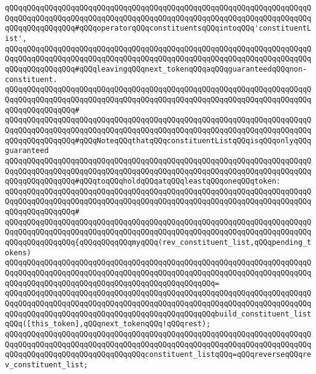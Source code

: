 \verb|qQQqqQQqqQQqqQQqqQQqqQQqqQQqqQQqqQQqqQQqqQQqqQQqqQQqqQQqqQQqqQQqqQQqqQQqqQQqqQQqqQQqqQQqqQQqqQQqqQQqqQQqqQQqqQQqqQQqqQQqqQQqqQQqqQQqqQQqqQQqqQQqqQQqqQQqqQQq#qQQqoperatorqQQqconstituentsqQQqintoqQQq'constituentList',|\newline
\verb|qQQqqQQqqQQqqQQqqQQqqQQqqQQqqQQqqQQqqQQqqQQqqQQqqQQqqQQqqQQqqQQqqQQqqQQqqQQqqQQqqQQqqQQqqQQqqQQqqQQqqQQqqQQqqQQqqQQqqQQqqQQqqQQqqQQqqQQqqQQqqQQqqQQqqQQqqQQq#qQQqleavingqQQqnext_tokenqQQqaqQQqguaranteedqQQqnon-constituent.|\newline
\verb|qQQqqQQqqQQqqQQqqQQqqQQqqQQqqQQqqQQqqQQqqQQqqQQqqQQqqQQqqQQqqQQqqQQqqQQqqQQqqQQqqQQqqQQqqQQqqQQqqQQqqQQqqQQqqQQqqQQqqQQqqQQqqQQqqQQqqQQqqQQqqQQqqQQqqQQqqQQq#|\newline
\verb|qQQqqQQqqQQqqQQqqQQqqQQqqQQqqQQqqQQqqQQqqQQqqQQqqQQqqQQqqQQqqQQqqQQqqQQqqQQqqQQqqQQqqQQqqQQqqQQqqQQqqQQqqQQqqQQqqQQqqQQqqQQqqQQqqQQqqQQqqQQqqQQqqQQqqQQqqQQq#qQQqNoteqQQqthatqQQqconstituentListqQQqisqQQqonlyqQQqguaranteed|\newline
\verb|qQQqqQQqqQQqqQQqqQQqqQQqqQQqqQQqqQQqqQQqqQQqqQQqqQQqqQQqqQQqqQQqqQQqqQQqqQQqqQQqqQQqqQQqqQQqqQQqqQQqqQQqqQQqqQQqqQQqqQQqqQQqqQQqqQQqqQQqqQQqqQQqqQQqqQQqqQQq#qQQqtoqQQqholdqQQqatqQQqleastqQQqoneqQQqtoken:|\newline
\verb|qQQqqQQqqQQqqQQqqQQqqQQqqQQqqQQqqQQqqQQqqQQqqQQqqQQqqQQqqQQqqQQqqQQqqQQqqQQqqQQqqQQqqQQqqQQqqQQqqQQqqQQqqQQqqQQqqQQqqQQqqQQqqQQqqQQqqQQqqQQqqQQqqQQqqQQqqQQq#|\newline
\verb|qQQqqQQqqQQqqQQqqQQqqQQqqQQqqQQqqQQqqQQqqQQqqQQqqQQqqQQqqQQqqQQqqQQqqQQqqQQqqQQqqQQqqQQqqQQqqQQqqQQqqQQqqQQqqQQqqQQqqQQqqQQqqQQqqQQqqQQqqQQqqQQqqQQqqQQqqQQq{qQQqqQQqqQQqmyqQQq(rev_constituent_list,qQQqpending_tokens)|\newline
\verb|qQQqqQQqqQQqqQQqqQQqqQQqqQQqqQQqqQQqqQQqqQQqqQQqqQQqqQQqqQQqqQQqqQQqqQQqqQQqqQQqqQQqqQQqqQQqqQQqqQQqqQQqqQQqqQQqqQQqqQQqqQQqqQQqqQQqqQQqqQQqqQQqqQQqqQQqqQQqqQQqqQQqqQQqqQQqqQQqqQQqqQQqqQQq=|\newline
\verb|qQQqqQQqqQQqqQQqqQQqqQQqqQQqqQQqqQQqqQQqqQQqqQQqqQQqqQQqqQQqqQQqqQQqqQQqqQQqqQQqqQQqqQQqqQQqqQQqqQQqqQQqqQQqqQQqqQQqqQQqqQQqqQQqqQQqqQQqqQQqqQQqqQQqqQQqqQQqqQQqqQQqqQQqqQQqqQQqqQQqqQQqqQQqbuild_constituent_listqQQq([this_token],qQQqnext_tokenqQQq!qQQqrest);|\newline
\newline
\verb|qQQqqQQqqQQqqQQqqQQqqQQqqQQqqQQqqQQqqQQqqQQqqQQqqQQqqQQqqQQqqQQqqQQqqQQqqQQqqQQqqQQqqQQqqQQqqQQqqQQqqQQqqQQqqQQqqQQqqQQqqQQqqQQqqQQqqQQqqQQqqQQqqQQqqQQqqQQqqQQqqQQqqQQqqQQqconstituent_listqQQq=qQQqreverseqQQqrev_constituent_list;|\newline
